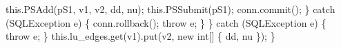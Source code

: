       this.PSAdd(pS1, v1, v2, dd, nu);
      this.PSSubmit(pS1);
      conn.commit();
    \} catch (SQLException e) \{
      conn.rollback();
      throw e;
    \}
  \} catch (SQLException e) \{
    throw e;
  \}
  this.lu_edges.get(v1).put(v2, new int[] \{ dd, nu \});
\}
\eatline
{}\nwendcode{}\nwdocspar

